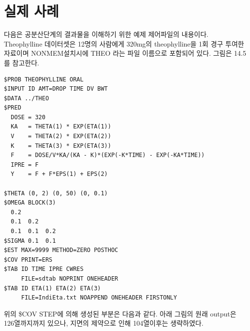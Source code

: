 \documentclass[
  10pt,
]{krantz}
\begin{document}
\hypertarget{uxc2e4uxc81c-uxc0acuxb840}{%
\section{실제 사례}\label{uxc2e4uxc81c-uxc0acuxb840}}

다음은 공분산단계의 결과물을 이해하기 위한 예제 제어파일의 내용이다. Theophylline 데이터셋은 12명의 사람에게
320mg의 theophylline을 1회 경구 투여한 자료이며 NONMEM설치시에 THEO 라는 파일 이름으로 포함되어 있다.
그림은 14.5를 참고한다.

\begin{verbatim}
$PROB THEOPHYLLINE ORAL
$INPUT ID AMT=DROP TIME DV BWT
$DATA ../THEO
$PRED
  DOSE = 320
  KA   = THETA(1) * EXP(ETA(1))
  V    = THETA(2) * EXP(ETA(2))
  K    = THETA(3) * EXP(ETA(3))
  F    = DOSE/V*KA/(KA - K)*(EXP(-K*TIME) - EXP(-KA*TIME))
  IPRE = F
  Y    = F + F*EPS(1) + EPS(2)

$THETA (0, 2) (0, 50) (0, 0.1)
$OMEGA BLOCK(3)
  0.2
  0.1  0.2
  0.1  0.1  0.2
$SIGMA 0.1  0.1
$EST MAX=9999 METHOD=ZERO POSTHOC
$COV PRINT=ERS
$TAB ID TIME IPRE CWRES
     FILE=sdtab NOPRINT ONEHEADER
$TAB ID ETA(1) ETA(2) ETA(3)
     FILE=IndiEta.txt NOAPPEND ONEHEADER FIRSTONLY
\end{verbatim}

위의 \$COV STEP에 의해 생성된 부분은 다음과 같다. 아래 그림의 원래 output은 126열까지까지 있으나, 지면의
제약으로 인해 104열이후는 생략하였다.
\end{document}
